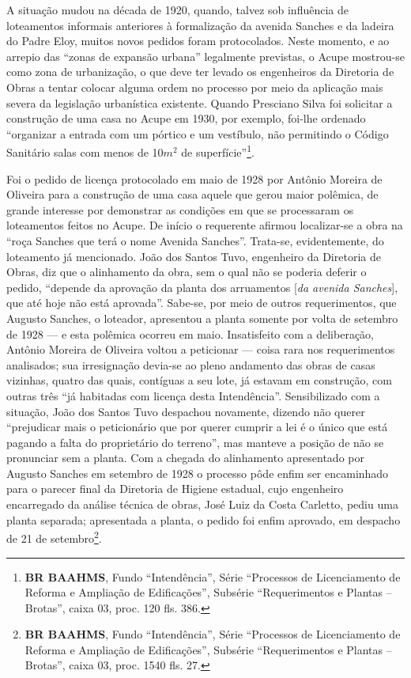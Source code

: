 A situação mudou na década de 1920, quando, talvez sob influência de loteamentos informais anteriores à formalização da avenida Sanches e da ladeira do Padre Eloy, muitos novos pedidos foram protocolados. Neste momento, e ao arrepio das ``zonas de expansão urbana'' legalmente previstas, o Acupe mostrou-se como zona de urbanização, o que deve ter levado os engenheiros da Diretoria de Obras a tentar colocar alguma ordem no processo por meio da aplicação mais severa da legislação urbanística existente. Quando Presciano Silva foi solicitar a construção de uma casa no Acupe em 1930, por exemplo, foi-lhe ordenado ``organizar a entrada com um pórtico e um vestíbulo, não permitindo o Código Sanitário salas com menos de 10$m^{2}$ de superfície''\footnote{\textbf{BR BAAHMS}, Fundo ``Intendência'', Série ``Processos de Licenciamento de Reforma e Ampliação de Edificações'', Subsérie ``Requerimentos e Plantas -- Brotas'', caixa 03, proc. 120 fls. 386.}. 

Foi o pedido de licença protocolado em maio de 1928 por Antônio Moreira de Oliveira para a construção de uma casa aquele que gerou maior polêmica, de grande interesse por demonstrar as condições em que se processaram os loteamentos feitos no Acupe. De início o requerente afirmou localizar-se a obra na ``roça Sanches que terá o nome Avenida Sanches''. Trata-se, evidentemente, do loteamento já mencionado. João dos Santos Tuvo, engenheiro da Diretoria de Obras, diz que o alinhamento da obra, sem o qual não se poderia deferir o pedido, ``depende da aprovação da planta dos arruamentos [\textit{da avenida Sanches}], que até hoje não está aprovada''. Sabe-se, por meio de outros requerimentos, que Augusto Sanches, o loteador, apresentou a planta somente por volta de setembro de 1928 --- e esta polêmica ocorreu em maio. Insatisfeito com a deliberação, Antônio Moreira de Oliveira voltou a peticionar --- coisa rara nos requerimentos analisados; sua irresignação devia-se ao pleno andamento das obras de casas vizinhas, quatro das quais, contíguas a seu lote, já estavam em construção, com outras três ``já habitadas com licença desta Intendência''. Sensibilizado com a situação, João dos Santos Tuvo despachou novamente, dizendo não querer ``prejudicar mais o peticionário que por querer cumprir a lei é o único que está pagando a falta do proprietário do terreno'', mas manteve a posição de não se pronunciar sem a planta. Com a chegada do alinhamento apresentado por Augusto Sanches em setembro de 1928 o processo pôde enfim ser encaminhado para o parecer final da Diretoria de Higiene estadual, cujo engenheiro encarregado da análise técnica de obras, José Luiz da Costa Carletto, pediu uma planta separada; apresentada a planta, o pedido foi enfim aprovado, em despacho de 21 de setembro\footnote{\textbf{BR BAAHMS}, Fundo ``Intendência'', Série ``Processos de Licenciamento de Reforma e Ampliação de Edificações'', Subsérie ``Requerimentos e Plantas -- Brotas'', caixa 03, proc. 1540 fls. 27.}. 

